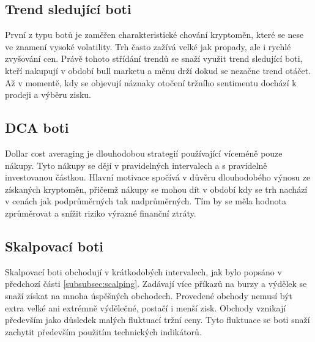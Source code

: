 \subsection{Trend sledující boti}
První z typu botů je zaměřen charakteristické chování kryptoměn, které se nese ve znamení vysoké volatility. Trh často zažívá velké jak propady, ale i rychlé zvyšování cen.
Právě tohoto střídání trendů se snaží využit trend sledující boti, kteří nakupují v období bull marketu a měnu drží dokud se nezačne trend otáčet. Až v momentě, kdy se objevují
náznaky otočení tržního sentimentu dochází k prodeji a výběru zisku.

\subsection{DCA boti}
Dollar cost averaging je dlouhodobou strategií používající víceméně pouze nákupy. Tyto nákupy se dějí v pravidelných intervalech a s pravidelně investovanou částkou.
Hlavní motivace spočívá v důvěru dlouhodobého výnosu ze získaných kryptoměn, přičemž nákupy se mohou dít v období kdy se trh nachází v cenách jak podprůměrných tak
nadprůměrných. Tím by se měla hodnota zprůměrovat a snížit riziko výrazné finanční ztráty.

\subsection{Skalpovací boti}
Skalpovací boti obchodují v krátkodobých intervalech, jak bylo popsáno v předchozí části \ref{subsubsec:scalping}. Zadávají více příkazů na burzy a výdělek se snaží
získat na mnoha úspěšných obchodech. Provedené obchody nemusí být extra velké ani extrémně výdělečné, postačí i menší zisk. Obchody vznikají především jako důsledek
malých fluktuací tržní ceny. Tyto fluktuace se boti snaží zachytit především použitím technických indikátorů.

\endinput